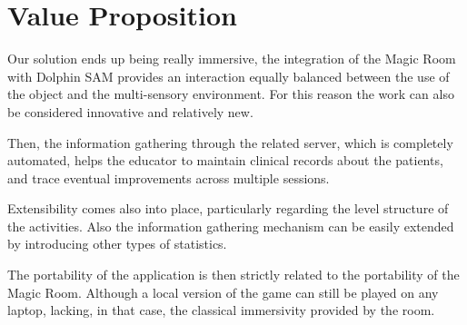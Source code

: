\chapter{Value Proposition}

Our solution ends up being really immersive, the integration of the Magic Room with Dolphin SAM provides an interaction equally balanced between the use of the object and the multi-sensory environment. 
For this reason the work can also be considered innovative and relatively new. 

Then, the information gathering through the related server, which is completely automated, helps the educator to maintain clinical records about the patients, and trace eventual improvements across multiple sessions.

Extensibility comes also into place, particularly regarding the level structure of the activities. Also the information gathering mechanism can be easily extended by introducing other types of statistics. 

The portability of the application is then strictly related to the portability of the Magic Room. Although a local version of the game can still be played on any laptop, lacking, in that case, the classical immersivity provided by the room.